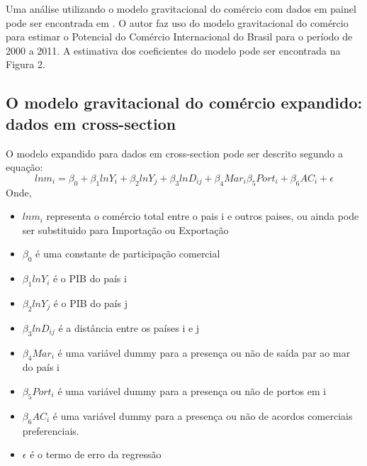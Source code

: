 \documentclass[12pt]{article}
\begin{document}
Uma análise utilizando o modelo gravitacional do comércio com dados em painel pode ser encontrada em \cite{elizama1}. O autor faz uso do modelo gravitacional do comércio para estimar o Potencial do Comércio Internacional do Brasil para o período de 2000 a 2011. A estimativa dos coeficientes do modelo pode ser encontrada na Figura 2. 




\subsection{O modelo gravitacional do comércio expandido: dados em cross-section}
O modelo expandido para dados em cross-section pode ser descrito segundo a equação: \[ln m_i = \beta_0 + \beta_1 ln Y_i + \beta_2 ln Y_j + \beta_3 ln D_{ij} + \beta_4 Mar_i \beta_5 Port_i + \beta_6 AC_i + \epsilon\] Onde, 
\begin{itemize}
\item $ln m_i$ representa o comércio total entre o pais i e outros paises, ou ainda pode ser substituido para Importação ou Exportação 
\item $\beta_0$ é uma constante de participação comercial
\item $\beta_1 ln Y_i$ é o PIB do país i 
\item $\beta_2 ln Y_j$ é o PIB do país j 
\item $\beta_3 ln D_{ij}$ é a distância entre os países i e j
\item $\beta_4 Mar_i$ é uma variável dummy para a presença ou não de saída par ao mar do país i
\item $\beta_5 Port_i$ é uma variável dummy para a presença ou não de portos em i 
\item $\beta_6 AC_i$ é uma variável dummy para a presença ou não de acordos comerciais preferenciais. 
\item $\epsilon$ é o termo de erro da regressão
\end{itemize}
\end{document}

